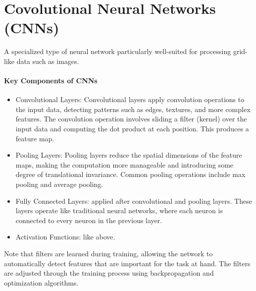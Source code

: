 \documentclass{article}
\begin{document}
\section{Covolutional Neural Networks (CNNs)}

A specialized type of neural network particularly well-suited for processing grid-like data such as images.

\paragraph{Key Components of CNNs}
\begin{itemize}
    \item Convolutional Layers: Convolutional layers apply convolution operations to the input data, detecting patterns such as edges, textures, and more complex features. The convolution operation involves sliding a filter (kernel) over the input data and computing the dot product at each position. This produces a feature map.
    \item Pooling Layers: Pooling layers reduce the spatial dimensions of the feature maps, making the computation more manageable and introducing some degree of translational invariance. Common pooling operations include max pooling and average pooling. 
    \item Fully Connected Layers: applied after convolutional and pooling layers. These layers operate like traditional neural networks, where each neuron is connected to every neuron in the previous layer.
    \item Activation Functions: like above. 
\end{itemize}
Note that filters are learned during training, allowing the network to automatically detect features that are important for the task at hand. The filters are adjusted through the training process using backpropagation and optimization algorithms.
\end{document}
